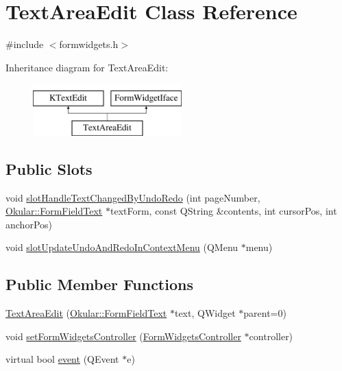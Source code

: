 \hypertarget{classTextAreaEdit}{\section{Text\+Area\+Edit Class Reference}
\label{classTextAreaEdit}
}


{\ttfamily \#include $<$formwidgets.\+h$>$}

Inheritance diagram for Text\+Area\+Edit\+:\begin{figure}[H]
\begin{center}
\leavevmode
\includegraphics[height=2.000000cm]{classTextAreaEdit}
\end{center}
\end{figure}
\subsection*{Public Slots}
\begin{DoxyCompactItemize}
\item 
void \hyperlink{classTextAreaEdit_ad3ac48ad237ebd71004785085df0d23a}{slot\+Handle\+Text\+Changed\+By\+Undo\+Redo} (int page\+Number, \hyperlink{classOkular_1_1FormFieldText}{Okular\+::\+Form\+Field\+Text} $\ast$text\+Form, const Q\+String \&contents, int cursor\+Pos, int anchor\+Pos)
\item 
void \hyperlink{classTextAreaEdit_a9093fdd4088d7c4c01b0bba3f44dcf37}{slot\+Update\+Undo\+And\+Redo\+In\+Context\+Menu} (Q\+Menu $\ast$menu)
\end{DoxyCompactItemize}
\subsection*{Public Member Functions}
\begin{DoxyCompactItemize}
\item 
\hyperlink{classTextAreaEdit_a80b6d983ef09baa909e6d822f6430aef}{Text\+Area\+Edit} (\hyperlink{classOkular_1_1FormFieldText}{Okular\+::\+Form\+Field\+Text} $\ast$text, Q\+Widget $\ast$parent=0)
\item 
void \hyperlink{classTextAreaEdit_a0eef63eea0033429f0dedf1208cb01f1}{set\+Form\+Widgets\+Controller} (\hyperlink{classFormWidgetsController}{Form\+Widgets\+Controller} $\ast$controller)
\item 
virtual bool \hyperlink{classTextAreaEdit_abc4486e113dfedf775a3a18f0685dde3}{event} (Q\+Event $\ast$e)
\end{DoxyCompactItemize}
